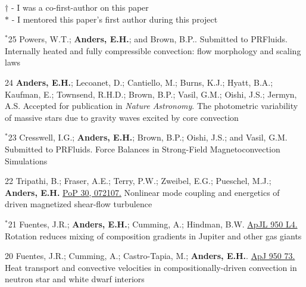 {}
\hspace{\smallsephintwidth}$\dagger$ - I was a co-first-author on this paper \\
\hspace{\smallsephintwidth}$*$ - I mentored this paper's first author during this project
\vspace{0.3cm}



      {$^*$25}
      {
        Powers, W.T.; \textbf{Anders, E.H.}; and Brown, B.P..
        Submitted to PRFluids.\hspace{-0.5cm}
      }
      {Internally heated and fully compressible convection: flow morphology and scaling laws}

\cvpub{}
      {24}
      {
        \textbf{Anders, E.H.}; Lecoanet, D.; Cantiello, M.; Burns, K.J.; Hyatt, B.A.; Kaufman, E.; Townsend, R.H.D.; Brown, B.P.; Vasil, G.M.; Oishi, J.S.; Jermyn, A.S. 
        Accepted for publication in \textit{Nature Astronomy}.     
      }
      {The photometric variability of massive stars due to gravity waves excited by core convection}

\cvpub{}
      {$^*$23}
      {
        Cresswell, I.G.; \textbf{Anders, E.H.}; Brown, B.P.; Oishi, J.S.; and Vasil, G.M.
        Submitted to PRFluids. 
      }
      {Force Balances in Strong-Field Magnetoconvection Simulations}

\cvpub{}
      {22}
      {
        Tripathi, B.; Fraser, A.E.; Terry, P.W.; Zweibel, E.G.; Pueschel, M.J.; \textbf{Anders, E.H.}
        \href{https://pubs.aip.org/aip/pop/article/30/7/072107/2902303/Nonlinear-mode-coupling-and-energetics-of-driven}{PoP 30, 072107.}
      }
      {Nonlinear mode coupling and energetics of driven magnetized shear-flow turbulence}


\cvpub{}
      {$^*$21}
      { Fuentes, J.R.; \textbf{Anders, E.H.}; Cumming, A.; Hindman, B.W. 
        \href{https://iopscience.iop.org/article/10.3847/2041-8213/acd774}{ApJL 950 L4.}
      }
      {Rotation reduces mixing of composition gradients in Jupiter and other gas giants}

\cvpub{}
      {20}
      {
        Fuentes, J.R.; Cumming, A.; Castro-Tapia, M.; \textbf{Anders, E.H.}. 
        \href{https://iopscience.iop.org/article/10.3847/1538-4357/accb56}{ApJ 950 73.}
      }
      {Heat transport and convective velocities in compositionally-driven convection in neutron star and white dwarf interiors}

